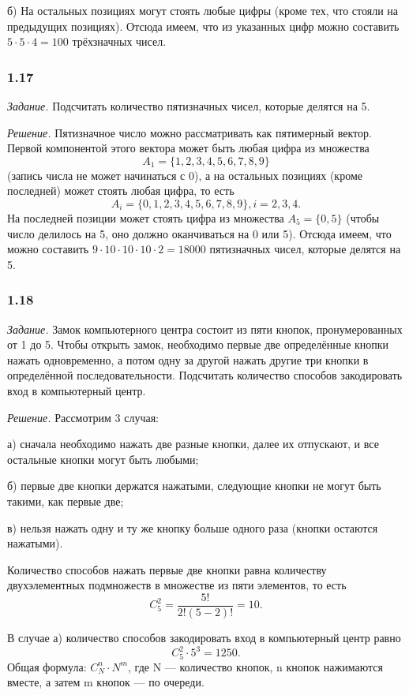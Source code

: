 \documentclass{book}
\begin{document}
б) На остальных позициях могут стоять любые цифры (кроме тех, что стояли на предыдущих позициях). Отсюда имеем, что из указанных цифр можно составить $5\cdot 5\cdot 4=100$ трёхзначных чисел.

\subsubsection*{1.17}

\textit{Задание.} Подсчитать количество пятизначных чисел, которые делятся на 5.

\textit{Решение.} Пятизначное число можно рассматривать как пятимерный вектор. Первой компонентой этого вектора может быть любая цифра из множества $$A_1=\{1, 2, 3, 4, 5, 6, 7, 8, 9\}$$ (запись числа не может начинаться с 0), а на остальных позициях (кроме последней) может стоять любая цифра, то есть $$A_i=\{0, 1, 2, 3, 4, 5, 6, 7, 8, 9\}, i=2, 3, 4.$$ На последней позиции может стоять цифра из множества $A_5=\{0, 5\}$ (чтобы число делилось на 5, оно должно оканчиваться на 0 или 5). Отсюда имеем, что можно составить $9\cdot 10\cdot 10\cdot 10\cdot 2=18000$ пятизначных чисел, которые делятся на 5.

\subsubsection*{1.18}

\textit{Задание.} Замок компьютерного центра состоит из пяти кнопок, пронумерованных от 1 до 5. Чтобы открыть замок, необходимо первые две определённые кнопки нажать одновременно, а потом одну за другой нажать другие три кнопки в определённой последовательности. Подсчитать количество способов закодировать вход в компьютерный центр.

\textit{Решение.} Рассмотрим 3 случая: 

а) сначала необходимо нажать две разные кнопки, далее их отпускают, и все остальные кнопки могут быть любыми; 

б) первые две кнопки держатся нажатыми, следующие кнопки не могут быть такими, как первые две; 

в) нельзя нажать одну и ту же кнопку больше одного раза (кнопки остаются нажатыми).

Количество способов нажать первые две кнопки равна количеству двухэлементных подмножеств в множестве из пяти элементов, то есть $$C_5^2=\frac{5!}{2!\left(5-2\right)!}=10.$$

В случае а) количество способов закодировать вход в компьютерный центр равно $$C_5^2\cdot 5^3=1250.$$ Общая формула: $C_N^n\cdot N^m$, где N --- количество кнопок, n кнопок нажимаются вместе, а затем m кнопок --- по очереди.
\end{document}
